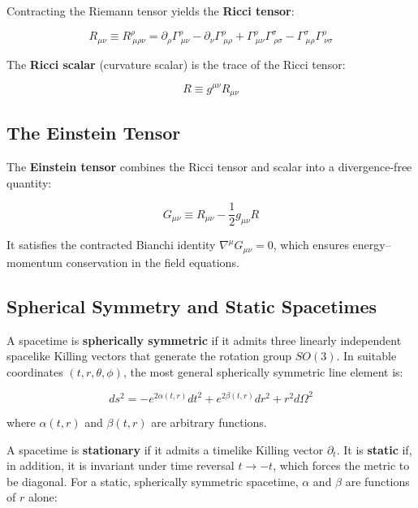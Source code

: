 \documentclass[12pt]{article}
\theoremstyle{definition}
\theoremstyle{remark}
\begin{document}
Contracting the Riemann tensor yields the \textbf{Ricci tensor}:

\begin{equation}\label{eq:ricci}
  R_{\mu\nu} \equiv R^{\rho}_{\ \mu\rho\nu}
  = \partial_{\rho}\Gamma^{\rho}_{\ \mu\nu} - \partial_{\nu}\Gamma^{\rho}_{\ \mu\rho}
    + \Gamma^{\rho}_{\ \mu\nu}\Gamma^{\sigma}_{\ \rho\sigma}
    - \Gamma^{\sigma}_{\ \mu\rho}\Gamma^{\rho}_{\ \nu\sigma}
\end{equation}

The \textbf{Ricci scalar} (curvature scalar) is the trace of the Ricci tensor:

\begin{equation}
  R \equiv g^{\mu\nu}R_{\mu\nu}
\end{equation}

\subsection{The Einstein Tensor}

The \textbf{Einstein tensor} combines the Ricci tensor and scalar into a divergence-free quantity:

\begin{equation}\label{eq:einstein-tensor}
  G_{\mu\nu} \equiv R_{\mu\nu} - \frac{1}{2}g_{\mu\nu}R
\end{equation}

It satisfies the contracted Bianchi identity $\nabla^{\mu}G_{\mu\nu} = 0$, which ensures energy--momentum conservation in the field equations.

\subsection{Spherical Symmetry and Static Spacetimes}

A spacetime is \textbf{spherically symmetric} if it admits three linearly independent spacelike Killing vectors that generate the rotation group $SO(3)$. In suitable coordinates $(t, r, \theta, \phi)$, the most general spherically symmetric line element is:

\begin{equation}\label{eq:spherical-general}
  ds^{2} = -e^{2\alpha(t,r)}dt^{2} + e^{2\beta(t,r)}dr^{2} + r^{2}d\Omega^{2}
\end{equation}

where $\alpha(t,r)$ and $\beta(t,r)$ are arbitrary functions.

A spacetime is \textbf{stationary} if it admits a timelike Killing vector $\partial_{t}$. It is \textbf{static} if, in addition, it is invariant under time reversal $t \to -t$, which forces the metric to be diagonal. For a static, spherically symmetric spacetime, $\alpha$ and $\beta$ are functions of $r$ alone:
\end{document}
